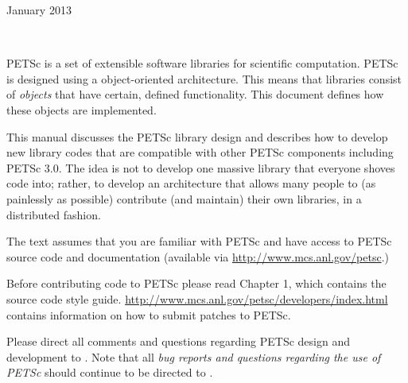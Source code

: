 \documentclass[twoside,12pt]{../sty/report_petsc}
\begin{document}
{}{January 2013}

\newpage

\hbox{ }

\vspace{1in}
\date{\today}


\newpage




\medskip \medskip


%
%

\medskip \medskip
PETSc is
a set of extensible software libraries for scientific computation.
PETSc is designed using a object-oriented
architecture. This means that libraries consist of {\em objects} that
have certain, defined functionality. This document defines how these
objects are implemented.

This manual discusses the PETSc library design and describes
how to develop new library codes that are compatible with other PETSc components
including PETSc 3.0.
The idea is not to develop one massive library that everyone shoves code
into; rather, to develop an architecture that allows many people
to (as painlessly as possible) contribute (and maintain) their own libraries,
in a distributed fashion.

The text assumes
that you are familiar with PETSc and have access to PETSc source code and documentation
(available via \href{http://www.mcs.anl.gov/petsc}{http://www.mcs.anl.gov/petsc}.)

Before contributing code to PETSc please read Chapter 1, which contains the source code style guide.
\href{http://www.mcs.anl.gov/petsc/developers/index.html}{http://www.mcs.anl.gov/petsc/developers/index.html}
contains information on how to submit patches to PETSc.

\vspace{1cm}

Please direct all comments and questions regarding PETSc design and
development to .  Note that all {\em
bug reports and questions regarding the use of PETSc} should continue
to be directed to .

%
%
\end{document}
